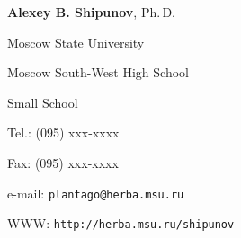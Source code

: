 \documentclass{etiketka}
\begin{document}
\begin{etiketka}[8]

\begin{center}

\large

\textbf{Alexey B. Shipunov}, Ph.\,D.

\normalsize

\medskip

\scshape

Moscow State University

Moscow South-West High School

Small School

\normalfont

\end{center}

\begin{footnotesize}

\raggedright

Tel.: (095) xxx-xxxx

Fax: (095) xxx-xxxx

e-mail: \texttt{plantago@herba.msu.ru}

WWW: \texttt{http://herba.msu.ru/shipunov}

\end{footnotesize}

\end{etiketka}
\end{document}
